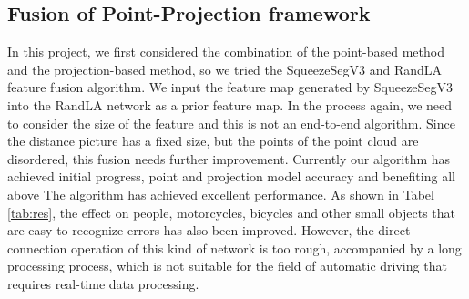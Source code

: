 \documentclass[final]{cvpr}
\begin{document}
\subsection{Fusion of Point-Projection framework}
In this project, we first considered the combination of the point-based method and the projection-based method, so we tried the SqueezeSegV3\cite{xu2020squeezesegv3} and RandLA\cite{2019RandLA} feature fusion algorithm. We input the feature map generated by  SqueezeSegV3\cite{xu2020squeezesegv3} into the RandLA\cite{2019RandLA} network as a prior feature map. In the process again, we need to consider the size of the feature and this is not an end-to-end algorithm.  Since the distance picture has a fixed size, but the points of the point cloud are disordered, this fusion needs further improvement.
Currently our algorithm has achieved initial progress, point and projection model accuracy and benefiting all above The algorithm has achieved excellent performance. As shown in Tabel \ref{tab:res}, the effect on people, motorcycles, bicycles and other small objects that are easy to recognize errors has also been improved.  However, the direct connection operation of this kind of network is too rough, accompanied by a long processing process, which is not suitable for the field of automatic driving that requires real-time data processing.
\end{document}
